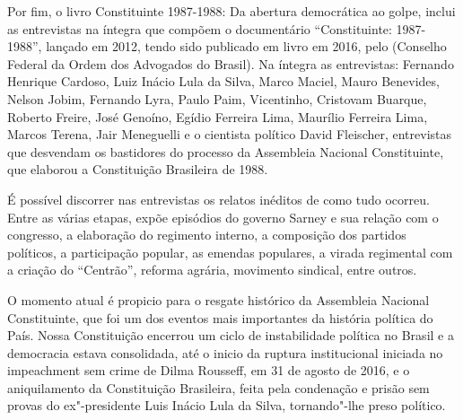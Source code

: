 Por fim, o livro Constituinte 1987-1988: Da abertura democrática ao golpe, inclui as entrevistas
na íntegra que compõem o documentário “Constituinte: 1987-1988”, lançado em 2012, tendo sido
publicado em livro em 2016, pelo  (Conselho Federal da Ordem dos Advogados do
Brasil). Na íntegra as entrevistas: Fernando Henrique Cardoso, Luiz Inácio Lula da Silva, Marco
Maciel, Mauro Benevides, Nelson Jobim, Fernando Lyra, Paulo Paim, Vicentinho, Cristovam Buarque,
Roberto Freire, José Genoíno, Egídio Ferreira Lima, Maurílio Ferreira Lima, Marcos Terena, Jair
Meneguelli e o cientista político David Fleischer, entrevistas que desvendam os bastidores do
processo da Assembleia Nacional Constituinte, que elaborou a Constituição Brasileira de 1988.

É possível discorrer nas entrevistas os relatos inéditos de como tudo ocorreu. Entre as várias
etapas, expõe episódios do governo Sarney e sua relação com o congresso, a elaboração do
regimento interno, a composição dos partidos políticos, a participação popular, as emendas
populares, a virada regimental com a criação do “Centrão”, reforma agrária, movimento sindical,
entre outros.

O momento atual é propicio para o resgate histórico da Assembleia Nacional Constituinte, que
foi um dos eventos mais importantes da história política do País. Nossa Constituição encerrou
um ciclo de instabilidade política no Brasil e a democracia estava consolidada, até o inicio da
ruptura institucional iniciada no impeachment sem crime de Dilma Rousseff, em 31 de agosto de
2016, e o aniquilamento da Constituição Brasileira, feita pela condenação e prisão sem provas
do ex"-presidente Luis Inácio Lula da Silva, tornando"-lhe preso político.